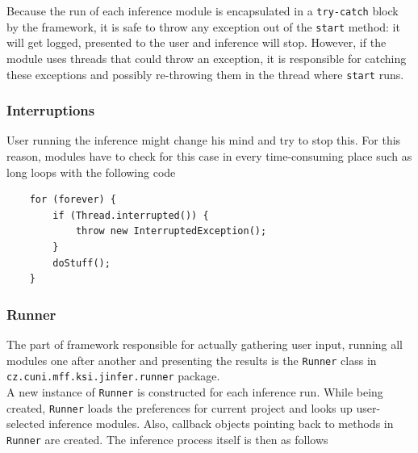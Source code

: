 \documentclass[a4paper,10pt,oneside]{article}
\newcommand{\code}[1]{\texttt{#1}}
\begin{document}
Because the run of each inference module is encapsulated in a \code{try-catch} block by the framework, it is safe to throw any exception out of the \code{start} method: it will get logged, presented to the user and inference will stop. However, if the module uses threads that could throw an exception, it is responsible for catching these exceptions and possibly re-throwing them in the thread where \code{start} runs.

\subsubsection{Interruptions}

User running the inference might change his mind and try to stop this. For this reason, modules have to check for this case in every time-consuming place such as long loops with the following code
\begin{verbatim}
	for (forever) {
		if (Thread.interrupted()) {
			throw new InterruptedException();
		}
		doStuff();
	}
\end{verbatim}

\subsubsection{Runner}

The part of framework responsible for actually gathering user input, running all modules one after another and presenting the results is the \code{Runner} class  in \code{cz.cuni.mff.ksi.jinfer.runner} package.\\

A new instance of \code{Runner} is constructed for each inference run. While being created, \code{Runner}  loads the preferences for current project and looks up user-selected inference modules. Also, callback objects pointing back to methods in \code{Runner} are created. The inference process itself is then as follows
\end{document}
